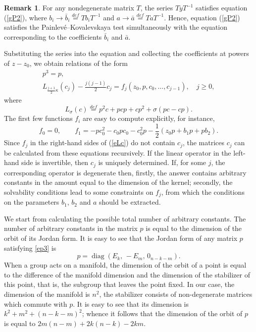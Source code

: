\documentclass{article}
\theoremstyle{plain}
\theoremstyle{definition}
\newtheorem{remark}{Remark}
\DeclareMathOperator{\diag}{diag}
\begin{document}
\begin{remark} 
For any nondegenerate matrix $T$, the series $T y T^{-1}$ satisfies equation (\ref{gP2}), where $b_i\to \bar b_i \stackrel{def}{=} T b_i T^{-1}$ and $a \to \bar a\stackrel{def}{=}T a T^{-1}$. Hence, equation (\ref{gP2}) satisfies the Painlev\'e--Kovalevskaya test simultaneously with the equation corresponding to the coefficients $\bar b_i$ and $\bar a$.
\end{remark} 

Substituting the series into the equation and collecting the coefficients at powers of $z-z_0$, we obtain relations of the form
\begin{gather}
\label{ep3}
 p^3=p,\\ 
\label{eLc}
 L_{\frac{j+1}{2}\kappa}(c_j) -\frac{j(j-1)}{2}c_j =f_j(z_0,p,c_0,\dots,c_{j-1}),\quad j\ge 0, 
\end{gather}
where 
\[
 L_\sigma(c) \stackrel{def}{=} p^2c + pcp+ cp^2 +\sigma(pc-cp).
\]
The first few functions $f_i$ are easy to compute explicitly, for instance,
\[
 f_0=0,\qquad f_1=-pc^2_0-c_0pc_0-c^2_0p-\frac{1}{2}(z_0p+b_1p+pb_2).
\]
Since $f_j$ in the right-hand sides of (\ref{eLc}) do not contain $c_j$, the matrices $c_j$ can be calculated from these equations recursively. If the linear operator in the left-hand side is invertible, then $c_j$ is uniquely determined. If, for some $j$, the corresponding operator is degenerate then, firstly, the answer contains arbitrary constants in the amount equal to the dimension of the kernel; secondly, the solvability conditions lead to some constraints on $f_j$, from which the conditions on the parameters $b_1$, $b_2$ and $a$ should be extracted.

We start from calculating the possible total number of arbitrary constants. The number of arbitrary constants in the matrix $p$ is equal to the dimension of the orbit of its Jordan form. It is easy to see that the Jordan form of any matrix $p$ satisfying \eqref{ep3} is
\[
 p=\diag(E_k,\, -E_m,\, 0_{n-k-m}).
\]  
When a group acts on a manifold, the dimension of the orbit of a point is equal to the difference of the manifold dimension and the dimension of the stabilizer of this point, that is, the subgroup that leaves the point fixed. In our case, the dimension of the manifold is $n^2$, the stabilizer consists of non-degenerate matrices which commute with $p$. It is easy to see that its dimension is $k^2+m^2+(n-k-m)^2$; whence it follows that the dimension of the orbit of $p$ is equal to $2m(n-m)+2k(n-k)-2km$.
\end{document}
